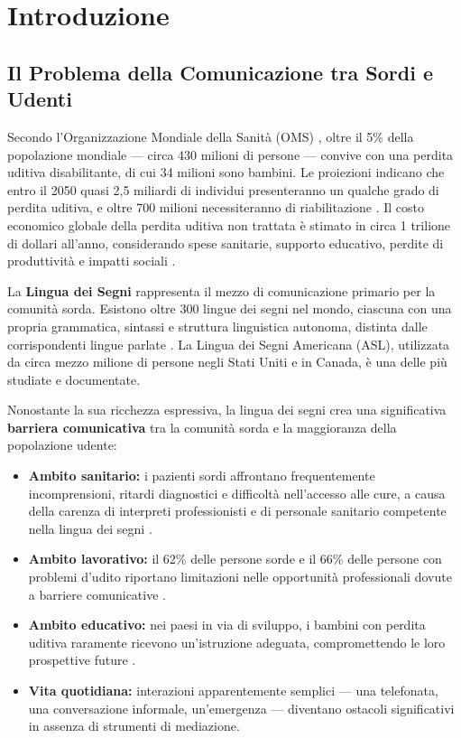 
\section{Introduzione}

\subsection{Il Problema della Comunicazione tra Sordi e Udenti}

Secondo l'Organizzazione Mondiale della Sanità (OMS) \cite{who2024deafness}, oltre il 5\% della popolazione mondiale --- circa 430 milioni di persone --- convive con una perdita uditiva disabilitante, di cui 34 milioni sono bambini. Le proiezioni indicano che entro il 2050 quasi 2,5 miliardi di individui presenteranno un qualche grado di perdita uditiva, e oltre 700 milioni necessiteranno di riabilitazione \cite{who2024deafness}. Il costo economico globale della perdita uditiva non trattata è stimato in circa 1 trilione di dollari all'anno, considerando spese sanitarie, supporto educativo, perdite di produttività e impatti sociali \cite{who2024hearingday}.

La \textbf{Lingua dei Segni} rappresenta il mezzo di comunicazione primario per la comunità sorda. Esistono oltre 300 lingue dei segni nel mondo, ciascuna con una propria grammatica, sintassi e struttura linguistica autonoma, distinta dalle corrispondenti lingue parlate \cite{wfd2024signlanguage}. La Lingua dei Segni Americana (ASL), utilizzata da circa mezzo milione di persone negli Stati Uniti e in Canada, è una delle più studiate e documentate.

Nonostante la sua ricchezza espressiva, la lingua dei segni crea una significativa \textbf{barriera comunicativa} tra la comunità sorda e la maggioranza della popolazione udente:
\begin{itemize}
    \item \textbf{Ambito sanitario:} i pazienti sordi affrontano frequentemente incomprensioni, ritardi diagnostici e difficoltà nell'accesso alle cure, a causa della carenza di interpreti professionisti e di personale sanitario competente nella lingua dei segni \cite{edf2023barriers}.
    \item \textbf{Ambito lavorativo:} il 62\% delle persone sorde e il 66\% delle persone con problemi d'udito riportano limitazioni nelle opportunità professionali dovute a barriere comunicative \cite{nagish2025survey}.
    \item \textbf{Ambito educativo:} nei paesi in via di sviluppo, i bambini con perdita uditiva raramente ricevono un'istruzione adeguata, compromettendo le loro prospettive future \cite{who2024deafness}.
    \item \textbf{Vita quotidiana:} interazioni apparentemente semplici --- una telefonata, una conversazione informale, un'emergenza --- diventano ostacoli significativi in assenza di strumenti di mediazione.
\end{itemize}

